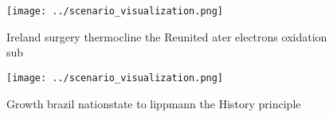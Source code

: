 \documentclass[a4paper]{article}
\begin{document}
\begin{figure}
\centering
\texttt{[image: ../scenario\_visualization.png]}
\caption{Ireland surgery thermocline the Reunited ater electrons oxidation sub
}
\end{figure}
 
\begin{figure}
\centering
\texttt{[image: ../scenario\_visualization.png]}
\caption{Growth brazil nationstate to lippmann the History principle
}
\end{figure}
 
\end{document}
